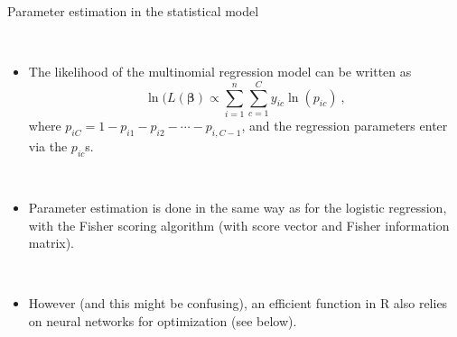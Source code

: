 \documentclass[10pt,ignorenonframetext,]{beamer}
\providecommand{\tightlist}{%
  \setlength{\itemsep}{0pt}\setlength{\parskip}{0pt}}
\begin{document}
\begin{frame}

\begin{block}{Parameter estimation in the statistical model}

\(~\)

\begin{itemize}
\tightlist
\item
  The likelihood of the multinomial regression model can be written as
  \[ \ln(L({\boldsymbol \beta})\propto \sum_{i=1}^n \sum_{c=1}^C y_{ic}\ln(p_{ic}) \ ,\]
  where \(p_{iC}=1-p_{i1}-p_{i2}-\cdots -p_{i,C-1}\), and the regression
  parameters enter via the \(p_{ic}\)s.
\end{itemize}

\(~\)

\begin{itemize}
\tightlist
\item
  Parameter estimation is done in the same way as for the logistic
  regression, with the Fisher scoring algorithm (with score vector and
  Fisher information matrix).
\end{itemize}

\(~\)

\begin{itemize}
\tightlist
\item
  However (and this might be confusing), an efficient function in R also
  relies on neural networks for optimization (see below).
\end{itemize}

\end{block}

\end{frame}
\end{document}
